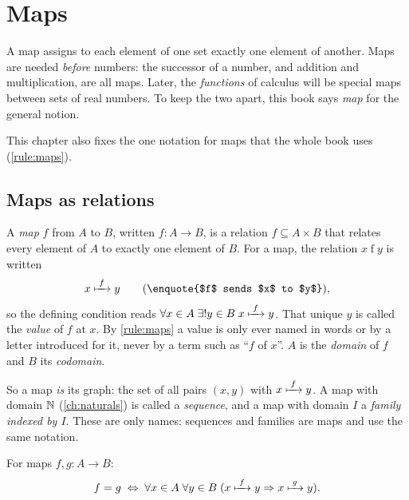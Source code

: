 \chapter{Maps}
\label{ch:maps}

A map assigns to each element of one set exactly one element of another. Maps are
needed \emph{before} numbers: the successor of a number, and addition and
multiplication, are all maps. Later, the \emph{functions} of calculus will be
special maps between sets of real numbers. To keep the two apart, this book says
\emph{map} for the general notion.

This chapter also fixes the one notation for maps that the whole book uses
(\cref{rule:maps}).

\section{Maps as relations}

\begin{definition}[Map]
\label{def:map}
A \emph{map} $f$ from $A$ to $B$, written $f \colon A \to B$, is a relation $f
\subseteq A \times B$ that relates every element of $A$ to exactly one element of
$B$. For a map, the relation $x \mathrel{f} y$ is written
\[
  x \via{f} y \qquad \text{(\enquote{$f$ sends $x$ to $y$})},
\]
so the defining condition reads $\forall x \in A\; \exists! y \in B\; x \xmapsto{\;f\;}
y$. That unique $y$ is called the \emph{value} of $f$ at $x$. By
\cref{rule:maps} a value is only ever named in words or by a letter introduced for
it, never by a term such as \enquote{$f$ of $x$}. $A$ is the \emph{domain} of $f$
and $B$ its \emph{codomain}.
\end{definition}

So a map \emph{is} its graph: the set of all pairs $(x, y)$ with $x \xmapsto{\;f\;} y$. A
map with domain $\mathbb{N}$ (\cref{ch:naturals}) is called a \emph{sequence}, and a map
with domain $I$ a \emph{family indexed by $I$}. These are only names: sequences and
families are maps and use the same notation.

\begin{theorem}
\label{thm:map-equality}
For maps $f, g \colon A \to B$:
\[
  f = g \;\Leftrightarrow\; \forall x \in A\; \forall y \in B\; (x \xmapsto{\;f\;} y
  \Rightarrow x \xmapsto{\;g\;} y).
\]
\end{theorem}

